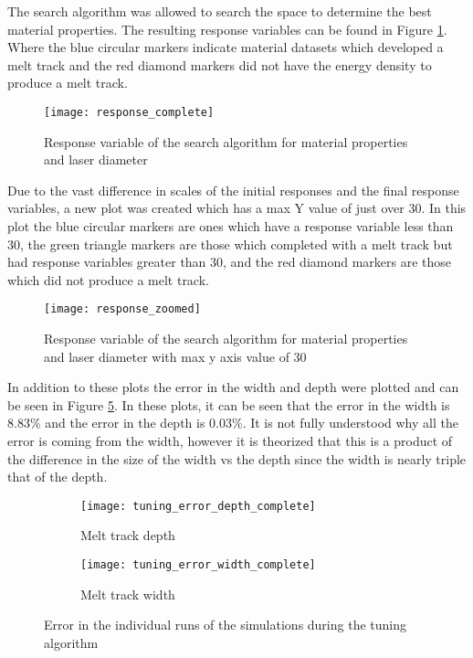 \label{results}

The search algorithm was allowed to search the space to determine the best material properties.  The resulting response variables can be found in Figure \ref{fig:response_complete}.  Where the blue circular markers indicate material datasets which developed a melt track and the red diamond markers did not have the energy density to produce a melt track.
\begin{figure}[!htb]
	\centering
	\texttt{[image: response\_complete]}
	\caption{Response variable of the search algorithm for material properties and laser diameter}
	\label{fig:response_complete}
\end{figure}
Due to the vast difference in scales of the initial responses and the final response variables, a new plot was created which has a max Y value of just over 30.  In this plot the blue circular markers are ones which have a response variable less than 30, the green triangle markers are those which completed with a melt track but had response variables greater than 30, and the red diamond markers are those which did not produce a melt track.
\begin{figure}[!htb]
	\centering
	\texttt{[image: response\_zoomed]}
	\caption{Response variable of the search algorithm for material properties and laser diameter with max y axis value of 30}
	\label{fig:response_zoomed}
\end{figure}
In addition to these plots the error in the width and depth were plotted and can be seen in Figure \ref{fig:tuning_error_complete}.  In these plots, it can be seen that the error in the width is 8.83\% and the error in the depth is 0.03\%.  It is not fully understood why all the error is coming from the width, however it is theorized that this is a product of the difference in the size of the width vs the depth since the width is nearly triple that of the depth.
\begin{figure}[!htb]\centering
	\begin{subfigure}[c]{0.475\textwidth}\centering
	\texttt{[image: tuning\_error\_depth\_complete]}
	\caption{Melt track depth}
	\label{fig:tuning_error_depth_complete}
	\end{subfigure}\hfill{}
		\begin{subfigure}[c]{0.475\textwidth}\centering
		\texttt{[image: tuning\_error\_width\_complete]}
		\caption{Melt track width}
		\label{fig:tuning_error_width_complete}
		\end{subfigure}
	\caption{Error in the individual runs of the simulations during the tuning algorithm}
	\label{fig:tuning_error_complete}
\end{figure}

